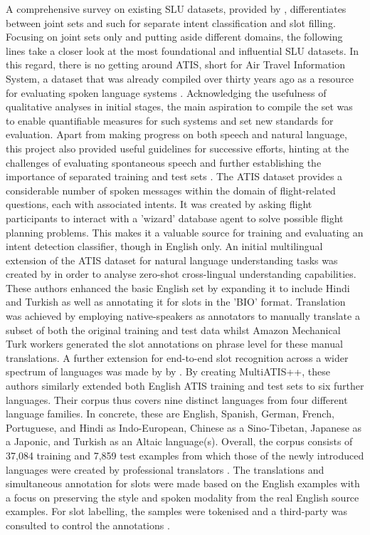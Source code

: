 \documentclass[11pt,a4paper,twoside,openright]{scrbook}
\begin{document}
A comprehensive survey on existing SLU datasets, provided by \citet{larson2022survey}, differentiates between joint sets and such for separate intent classification and slot filling. Focusing on joint sets only and putting aside different domains, the following lines take a closer look at the most foundational and influential SLU datasets. In this regard, there is no getting around ATIS, short for Air Travel Information System, a dataset that was already compiled over thirty years ago as a resource for evaluating spoken language systems \citep{price-1990-evaluation, hemphill-etal-1990-atis}. Acknowledging the usefulness of qualitative analyses in initial stages, the main aspiration to compile the set was to enable quantifiable measures for such systems and set new standards for evaluation. Apart from making progress on both speech and natural language, this project also provided useful guidelines for successive efforts, hinting at the challenges of evaluating spontaneous speech and further establishing the importance of separated training and test sets \citep{price-1990-evaluation, hemphill-etal-1990-atis}. The ATIS dataset provides a considerable number of spoken messages within the domain of flight-related questions, each with associated intents. It was created by asking flight participants to interact with a 'wizard' database agent to solve possible flight planning problems. This makes it a valuable source for training and evaluating an intent detection classifier, though in English only. An initial multilingual extension of the ATIS dataset for natural language understanding tasks was created by \citet{upandhyay_atis_zeroshot} in order to analyse zero-shot cross-lingual understanding capabilities. These authors enhanced the basic English set by expanding it to include Hindi and Turkish as well as annotating it for slots in the 'BIO' format. Translation was achieved by employing native-speakers as annotators to manually translate a subset of both the original training and test data whilst Amazon Mechanical Turk workers generated the slot annotations on phrase level for these manual translations. A further extension for end-to-end slot recognition across a wider spectrum of languages was made by by \citet{xu-etal-2020-end}. By creating MultiATIS++, these authors similarly extended both English ATIS training and test sets to six further languages. Their corpus thus covers nine distinct languages from four different language families. In concrete, these are English, Spanish, German, French, Portuguese, and Hindi as Indo-European, Chinese as a Sino-Tibetan, Japanese as a Japonic, and Turkish as an Altaic language(s). Overall, the corpus consists of 37,084 training and 7,859 test examples from which those of the newly introduced languages were created by professional translators \citep{xu-etal-2020-end}. The translations and simultaneous annotation for slots were made based on the English examples with a focus on preserving the style and spoken modality from the real English source examples. For slot labelling, the samples were tokenised and a third-party was consulted to control the annotations \citep{xu-etal-2020-end}.
\end{document}
